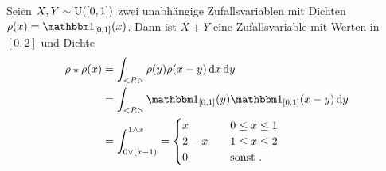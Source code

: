 \begin{example}
	Seien $X,Y \sim \operatorname{U}([0,1])$ zwei unabhängige Zufallsvariablen mit Dichten $\rho(x) = \indi_{[0,1]}(x)$. Dann ist $X+Y$ eine Zufallsvariable mit Werten in $[0,2]$ und Dichte
	\begin{align*}
		\rho \star \rho(x) &= \int_{\R} \rho(y) \rho(x-y) \d x \d y\\
		&= \int_{\R} \indi_{[0,1]}(y) \indi_{[0,1]}(x-y) \d y\\
		&= \int_{0 \vee (x-1)}^{1 \wedge x} = \begin{cases}
		x &\quad 0 \le x \le 1\\
		2 -x &\quad 1 \le x \le 2\\
		0 &\quad \sonst.
		\end{cases}
	\end{align*} %
%	
%	
\end{example}
